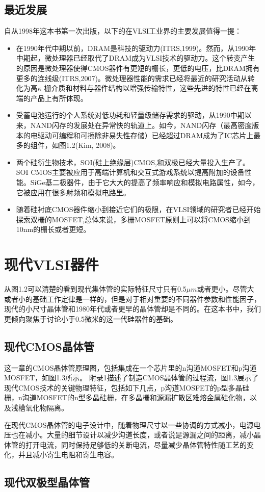 \documentclass[cn,11pt,chinese]{elegantbook}
\begin{document}
\subsection{最近发展}
自从1998年这本书第一次出版，以下的在VLSI工业界的主要发展值得一提：
\begin{itemize}
	\item 在1990年代中期以前，DRAM是科技的驱动力(ITRS,1999)。然而，从1990年中期起，微处理器已经取代了DRAM成为VLSI技术的驱动力。这个转变产生的原因是微处理器使得CMOS器件有更短的栅长，更低的电压，比DRAM拥有更多的连线级(ITRS,2007)。微处理器性能的需求已经将最近的研究活动从转化为高$\kappa$ 栅介质和材料与器件结构以增强传输特性，这些先进的特性已经在高端的产品上有所体现。
	
	\item 受蓄电池运行的个人系统对低功耗和轻量级储存需求的驱动，从1990中期以来，NAND闪存的发展处在异常快的轨道上。如今，NAND闪存（最高密度版本的电驱动可编程和可擦除非易失性存储）已经超过DRAM成为了IC芯片上最多的组件，如图1.2(Kim, 2008)。
	
	\item 两个硅衍生物技术，SOI(硅上绝缘层)CMOS,和双极已经大量投入生产了。SOI CMOS主要被应用于高端计算机和交互式游戏系统以提高附加的设备性能。SiGe基二极器件，由于它大大的提高了频率响应和模拟电路属性，如今，它被应用在很多射频和模拟电路里。
	
	\item 随着硅衬底CMOS器件缩小到接近它们的极限，在VLSI领域的研究者已经开始探索双栅的MOSFET,总体来说，多栅MOSFET原则上可以将CMOS缩小到10nm的栅长或者更短。

\end{itemize}

\section{现代VLSI器件}
从图1.2可以清楚的看到现代集体管的实际特征尺寸只有0.5$\mu m$或者更小。尽管大或者小的基础工作定律是一样的，但是对于相对重要的不同器件参数和性能因子，现代的小尺寸晶体管和1980年代或者更早的晶体管却是不同的。在这本书中，我们更倾向聚焦于讨论小于0.5微米的这一代硅器件的基础。
\subsection{现代CMOS晶体管}
	这一章的CMOS晶体管原理图，包括集成在一个芯片里的n沟道MOSFET和p沟道MOSFET，如图1.3所示。
附录1描述了制造CMOS晶体管的过程流，图1.3展示了现代CMOS技术的关键物理特征，包括如下几点，p沟道MOSFET的p型多晶硅栅，n沟道MOSFET的n型多晶硅栅，在多晶栅和源漏扩散区难熔金属硅化物，以及浅槽氧化物隔离。

在现代CMOS晶体管的电子设计中，随着物理尺寸以一些协调的方式减小，电源电压也在减小。大量的细节设计以减少沟道长度，或者说是源漏之间的距离，减小晶体管的打开电流，同时保持足够低的关断电流，尽量减少晶体管特性随工艺的变化，并且减小寄生电阻和寄生电容。

\subsection{现代双极型晶体管}
\end{document}

